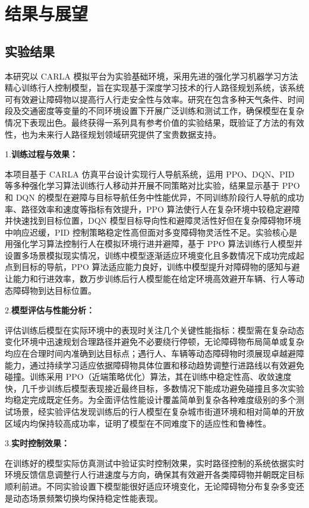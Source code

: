 \chapter{结果与展望}

\section{实验结果}

本研究以 CARLA 模拟平台为实验基础环境，采用先进的强化学习机器学习方法精心训练行人控制模型，旨在实现基于深度学习技术的行人路径规划系统，该系统可有效避让障碍物以提高行人行走安全性与效率。研究在包含多种天气条件、时间段及交通密度等变量的不同环境设置下开展广泛训练和测试工作，确保模型在复杂情况下表现出色。最终获得一系列具有参考价值的实验结果，既验证了方法的有效性，也为未来行人路径规划领域研究提供了宝贵数据支持。

1.\textbf{训练过程与效果：}

本项目基于 CARLA 仿真平台设计实现行人导航系统，运用 PPO、DQN、PID 等多种强化学习算法训练行人移动并开展不同策略对比实验，结果显示基于 PPO 和 DQN 的模型在避障与目标导航任务中性能优异，不同训练阶段行人导航的成功率、路径效率和速度等指标有效提升，PPO 算法使行人在复杂环境中较稳定避障并快速找到目标位置，DQN 模型目标导向性和避障灵活性好但在复杂障碍物环境中响应迟缓，PID 控制策略稳定性高但面对多变障碍物灵活性不足。实验核心是用强化学习算法控制行人在模拟环境行进并避障，基于 PPO 算法训练行人模型并设置多场景模拟现实情况，训练中模型逐渐适应环境变化且多数情况下成功完成起点到目标的导航，PPO 算法适应能力良好，训练中模型提升对障碍物的感知与避让能力和行进效率，数万步训练后行人模型能在给定环境高效避开车辆、行人等动态障碍物到达目标位置。

2.\textbf{模型评估与性能分析：}

评估训练后模型在实际环境中的表现时关注几个关键性能指标：模型需在复杂动态变化环境中迅速规划合理路径并避免不必要绕行停顿，无论障碍物布局简单或复杂均应在合理时间内准确到达目标点；遇行人、车辆等动态障碍物时须展现卓越避障能力，通过持续学习适应依据障碍物具体位置和移动趋势调整行进路线以有效避免碰撞。训练采用 PPO（近端策略优化）算法，其在训练中稳定性高、收敛速度快，几千步训练后模型表现接近最终目标，多数情况下能成功避免碰撞且多次实验均稳定完成既定任务。为全面评估性能设计覆盖简单到复杂各种难度级别的多个测试场景，经实验评估发现训练后的行人模型在复杂城市街道环境和相对简单的开放区域内均保持较高成功率，证明了模型在不同难度下的适应性和鲁棒性。

3.\textbf{实时控制效果：}

在训练好的模型实际仿真测试中验证实时控制效果，实时路径控制的系统依据实时环境反馈信息调整行人行进速度与方向，确保其有效避开各类障碍物并朝既定目标顺利前进。不同实验设置下模型能很好适应环境变化，无论障碍物分布复杂多变还是动态场景频繁切换均保持稳定性能表现。

